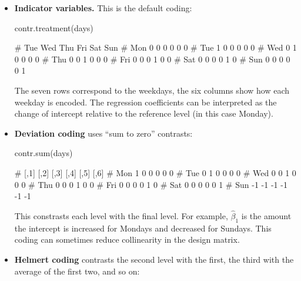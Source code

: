 \documentclass[
  a4paper,
]{article}
\newenvironment{Shaded}{\begin{snugshade}}{\end{snugshade}}
\newcommand{\FunctionTok}[1]{\textcolor[rgb]{0.00,0.00,0.00}{#1}}
\newcommand{\NormalTok}[1]{#1}
\theoremstyle{definition}
\theoremstyle{definition}
\theoremstyle{definition}
\theoremstyle{definition}
\theoremstyle{remark}
\begin{document}
\begin{itemize}
\item
  \textbf{Indicator variables.} This is the default coding:

\begin{Shaded}
\begin{Highlighting}[]
\FunctionTok{contr.treatment}\NormalTok{(days)}
\end{Highlighting}
\end{Shaded}

\begin{Shaded}
\begin{Highlighting}[]
\NormalTok{\#     Tue Wed Thu Fri Sat Sun}
\NormalTok{\# Mon   0   0   0   0   0   0}
\NormalTok{\# Tue   1   0   0   0   0   0}
\NormalTok{\# Wed   0   1   0   0   0   0}
\NormalTok{\# Thu   0   0   1   0   0   0}
\NormalTok{\# Fri   0   0   0   1   0   0}
\NormalTok{\# Sat   0   0   0   0   1   0}
\NormalTok{\# Sun   0   0   0   0   0   1}
\end{Highlighting}
\end{Shaded}

  The seven rows correspond to the weekdays, the six columns show how each
  weekday is encoded. The regression coefficients can be interpreted as the
  change of intercept relative to the reference level (in this case Monday).
\item
  \textbf{Deviation coding} uses ``sum to zero'' contrasts:

\begin{Shaded}
\begin{Highlighting}[]
\FunctionTok{contr.sum}\NormalTok{(days)}
\end{Highlighting}
\end{Shaded}

\begin{Shaded}
\begin{Highlighting}[]
\NormalTok{\#     [,1] [,2] [,3] [,4] [,5] [,6]}
\NormalTok{\# Mon    1    0    0    0    0    0}
\NormalTok{\# Tue    0    1    0    0    0    0}
\NormalTok{\# Wed    0    0    1    0    0    0}
\NormalTok{\# Thu    0    0    0    1    0    0}
\NormalTok{\# Fri    0    0    0    0    1    0}
\NormalTok{\# Sat    0    0    0    0    0    1}
\NormalTok{\# Sun   {-}1   {-}1   {-}1   {-}1   {-}1   {-}1}
\end{Highlighting}
\end{Shaded}

  This constrasts each level with the final level. For example,
  \(\hat\beta_1\) is the amount the intercept is increased for Mondays
  and decreased for Sundays. This coding can sometimes reduce collinearity
  in the design matrix.
\item
  \textbf{Helmert coding} contrasts the second level with the first, the third with
  the average of the first two, and so on:


\end{itemize}
\end{document}

